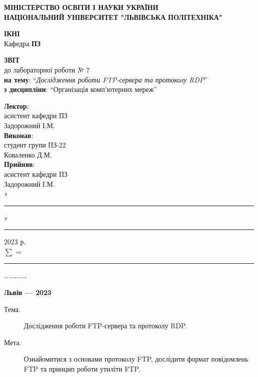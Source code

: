\documentclass{article}
\newcommand\subject{Організація комп’ютерних мереж}
\newcommand\lecturer{асистент кафедри ПЗ \\ Задорожний І.М.}
\newcommand\teacher{асистент кафедри ПЗ \\ Задорожний І.М.}
\newcommand\mygroup{ПЗ-22}
\newcommand\lab{7}
\newcommand\theme{Дослідження роботи FTP-сервера та протоколу RDP}
\newcommand\purpose{Ознайомитися з основами протоколу FTP, дослідити формат
	повідомлень FTP та принцип роботи утиліти FTP}
\begin{document}
\begin{normalsize}
	\begin{titlepage}
		\thispagestyle{empty}
		\begin{center}
			\textbf{МІНІСТЕРСТВО ОСВІТИ І НАУКИ УКРАЇНИ\\
				НАЦІОНАЛЬНИЙ УНІВЕРСИТЕТ "ЛЬВІВСЬКА ПОЛІТЕХНІКА"}
		\end{center}
		\begin{flushright}
			\textbf{ІКНІ}\\
			Кафедра \textbf{ПЗ}
		\end{flushright}
		\vspace{200pt}
		\begin{center}
			\textbf{ЗВІТ}\\
			\vspace{10pt}
			до лабораторної роботи № \lab\\
			\textbf{на тему}: “\textit{\theme}”\\
			\textbf{з дисципліни}: “\subject”
		\end{center}
		\vspace{112pt}
		\begin{flushright}
			
			\textbf{Лектор}:\\
			\lecturer\\
			\vspace{28pt}
			\textbf{Виконав}:\\
			
			студент групи \mygroup\\
			Коваленко Д.М.\\
			\vspace{28pt}
			\textbf{Прийняв}:\\
			
			\teacher\\
			
			\vspace{28pt}
			«\rule{1cm}{0.15mm}» \rule{1.5cm}{0.15mm} 2023 р.\\
			$\sum$ = \rule{1cm}{0.15mm}……………\\
			
		\end{flushright}
		\vspace{\fill}
		\begin{center}
			\textbf{Львів — 2023}
		\end{center}
	\end{titlepage}
		
	\begin{description}
		\item[Тема.] \theme.
		\item[Мета.] \purpose.
	\end{description}


\end{normalsize}
\end{document}
